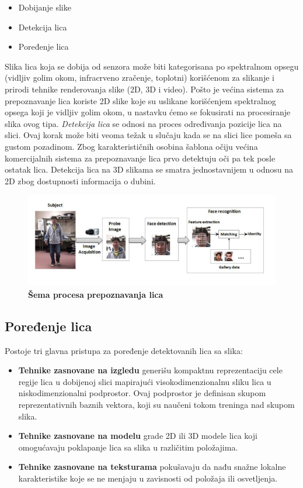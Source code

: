 \documentclass[11pt, a4paper]{article}
\begin{document}
\begin{itemize}
    \item Dobijanje slike
    \item Detekcija lica
    \item Poređenje lica
\end{itemize}

Slika lica koja se dobija od senzora može biti kategorisana po  spektralnom opsegu (vidljiv golim okom, infracrveno zračenje, toplotni) korišćenom za slikanje i prirodi tehnike renderovanja slike (2D, 3D i video). Pošto je većina sistema za prepoznavanje lica koriste 2D slike koje su uslikane korišćenjem spektralnog opsega koji je vidljiv golim okom, u nastavku ćemo se fokusirati na procesiranje slika ovog tipa. \textit{Detekcija lica} se odnosi na proces određivanja pozicije lica na slici. Ovaj korak može biti veoma težak u slučaju kada se na slici lice pomeša sa gustom pozadinom. Zbog karakterističnih osobina šablona očiju većina komercijalnih sistema za prepoznavanje lica prvo detektuju oči pa tek posle ostatak lica. Detekcija lica na 3D slikama se smatra jednostavnijem u odnosu na 2D zbog dostupnosti informacija o dubini.

\begin{figure}[h!]
	\centerline{\includegraphics[width=0.8\linewidth]{face_rec_sch.png}}
	\caption{\textbf{Šema procesa prepoznavanja lica}}
	\label{fig:points}
\end{figure}

\subsection{Poređenje lica}

Postoje tri glavna pristupa za poređenje detektovanih lica sa slika:
\begin{itemize}
    \item \textbf{Tehnike zasnovane na izgledu} generišu kompaktnu reprezentaciju cele regije lica u dobijenoj slici mapirajući visokodimenzionalnu sliku lica u niskodimenzionalni podprostor. Ovaj podprostor je definisan skupom reprezentativnih baznih vektora, koji su naučeni tokom treninga nad skupom slika. 
    \item \textbf{Tehnike zasnovane na modelu} grade 2D ili 3D modele lica koji omogućavaju poklapanje lica sa slika u različitim položajima.
    \item \textbf{Tehnike zasnovane na teksturama} pokušavaju da nađu snažne  lokalne karakteristike koje se ne menjaju u zavisnosti od položaja ili osvetljenja.
\end{itemize}
\end{document}

